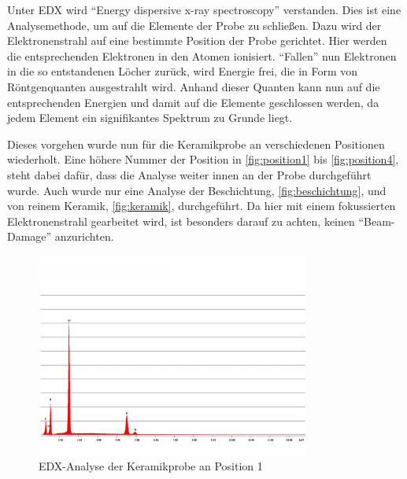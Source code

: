 \documentclass[12pt,english,ngerman]{scrartcl}
\begin{document}
Unter EDX wird ``Energy dispersive x-ray spectroscopy'' verstanden. Dies ist
eine Analysemethode, um auf die Elemente der Probe zu schließen. Dazu wird der
Elektronenstrahl auf eine bestimmte Position der Probe gerichtet. Hier werden
die entsprechenden Elektronen in den Atomen ionisiert. ``Fallen'' nun
Elektronen in die so entstandenen Löcher zurück, wird Energie frei, die in Form
von Röntgenquanten ausgestrahlt wird. Anhand dieser Quanten kann nun auf die
entsprechenden Energien und damit auf die Elemente geschlossen werden, da jedem
Element ein signifikantes Spektrum zu Grunde liegt.

Dieses vorgehen wurde nun für die Keramikprobe an verschiedenen Positionen
wiederholt. Eine höhere Nummer der Position in \autoref{fig:position1} bis
\autoref{fig:position4},
steht dabei dafür, dass die Analyse weiter innen an der Probe durchgeführt
wurde. Auch wurde nur eine Analyse der Beschichtung,
\autoref{fig:beschichtung}, und von reinem Keramik, \autoref{fig:keramik},
durchgeführt. Da hier mit einem fokussierten Elektronenstrahl gearbeitet wird,
ist besonders darauf zu achten, keinen ``Beam-Damage'' anzurichten.

\begin{figure}[H]
	\begin{center}
		\includegraphics[width =0.8\textwidth]{./figures/edx1.png}
	\end{center}
	\caption{EDX-Analyse der Keramikprobe an Position 1~\cite{sein_foto}
	}\label{fig:position1}
\end{figure}
\end{document}
